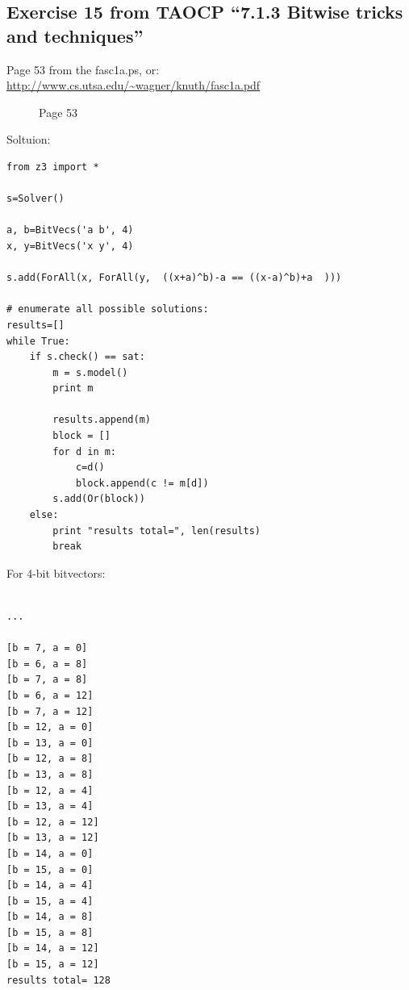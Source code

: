 \subsection{Exercise 15 from TAOCP ``7.1.3 Bitwise tricks and techniques''}

Page 53 from the fasc1a.ps, or: \url{http://www.cs.utsa.edu/~wagner/knuth/fasc1a.pdf}

\begin{figure}[H]
\label{fig:pipe_shuffled}
\centering
{}
\caption{Page 53}
\end{figure}

Soltuion:

\begin{lstlisting}
from z3 import *

s=Solver()

a, b=BitVecs('a b', 4)
x, y=BitVecs('x y', 4)

s.add(ForAll(x, ForAll(y,  ((x+a)^b)-a == ((x-a)^b)+a  )))

# enumerate all possible solutions:
results=[]
while True:
    if s.check() == sat:
        m = s.model()
        print m

        results.append(m)
        block = []
        for d in m:
            c=d()
            block.append(c != m[d])
        s.add(Or(block))
    else:
        print "results total=", len(results)
        break
\end{lstlisting}

For 4-bit bitvectors:

\begin{lstlisting}

...

[b = 7, a = 0]
[b = 6, a = 8]
[b = 7, a = 8]
[b = 6, a = 12]
[b = 7, a = 12]
[b = 12, a = 0]
[b = 13, a = 0]
[b = 12, a = 8]
[b = 13, a = 8]
[b = 12, a = 4]
[b = 13, a = 4]
[b = 12, a = 12]
[b = 13, a = 12]
[b = 14, a = 0]
[b = 15, a = 0]
[b = 14, a = 4]
[b = 15, a = 4]
[b = 14, a = 8]
[b = 15, a = 8]
[b = 14, a = 12]
[b = 15, a = 12]
results total= 128
\end{lstlisting}

